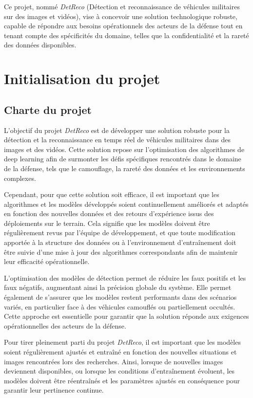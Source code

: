 Ce projet, nommé \textit{DetReco} (Détection et reconnaissance de véhicules militaires sur des images et vidéos), vise à concevoir une solution technologique robuste, capable de répondre aux besoins opérationnels des acteurs de la défense tout en tenant compte des spécificités du domaine, telles que la confidentialité et la rareté des données disponibles.


\section{Initialisation du projet}
\subsection{Charte du projet}

L’objectif du projet \textit{DetReco} est de développer une solution robuste pour la détection et la reconnaissance en temps réel de véhicules militaires dans des images et des vidéos.
Cette solution repose sur l'optimisation des algorithmes de deep learning afin de surmonter les défis spécifiques rencontrés dans le domaine de la défense, tels que le camouflage, la rareté des données et les environnements complexes.

Cependant, pour que cette solution soit efficace, il est important que les algorithmes et les modèles développés soient continuellement améliorés et adaptés en fonction des nouvelles données et des retours d'expérience issus des déploiements sur le terrain.
Cela signifie que les modèles doivent être régulièrement revus par l'équipe de développement, et que toute modification apportée à la structure des données ou à l'environnement d'entraînement doit être suivie d'une mise à jour des algorithmes correspondants afin de maintenir leur efficacité opérationnelle.

L’optimisation des modèles de détection permet de réduire les faux positifs et les faux négatifs, augmentant ainsi la précision globale du système.
Elle permet également de s'assurer que les modèles restent performants dans des scénarios variés, en particulier face à des véhicules camouflés ou partiellement occultés.
Cette approche est essentielle pour garantir que la solution réponde aux exigences opérationnelles des acteurs de la défense.

Pour tirer pleinement parti du projet \textit{DetReco}, il est important que les modèles soient régulièrement ajustés et entraîné en fonction des nouvelles situations et images rencontrées lors des recherches.
Ainsi, lorsque de nouvelles images deviennent disponibles, ou lorsque les conditions d'entraînement évoluent, les modèles doivent être réentraînés et les paramètres ajustés en conséquence pour garantir leur pertinence continue.



